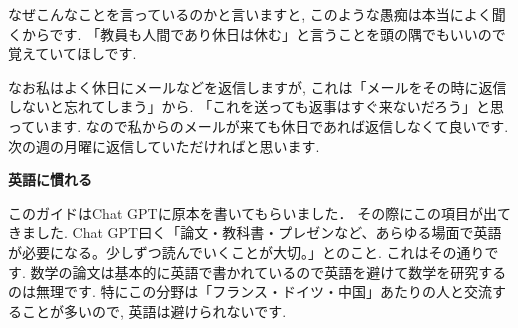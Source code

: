 なぜこんなことを言っているのかと言いますと, このような愚痴は本当によく聞くからです. 「教員も人間であり休日は休む」と言うことを頭の隅でもいいので覚えていてほしです.  

なお私はよく休日にメールなどを返信しますが, これは「メールをその時に返信しないと忘れてしまう」から.
「これを送っても返事はすぐ来ないだろう」と思っています. なので私からのメールが来ても休日であれば返信しなくて良いです. 次の週の月曜に返信していただければと思います. 
\vspace{8pt} 

\textbf{英語に慣れる}  　\vspace{-6pt} 

このガイドはChat GPTに原本を書いてもらいました．
その際にこの項目が出てきました. 
Chat GPT曰く「論文・教科書・プレゼンなど、あらゆる場面で英語が必要になる。少しずつ読んでいくことが大切。」とのこと. 
これはその通りです. 数学の論文は基本的に英語で書かれているので英語を避けて数学を研究するのは無理です. 特にこの分野は「フランス・ドイツ・中国」あたりの人と交流することが多いので, 英語は避けられないです. 

